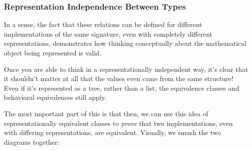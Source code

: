 \documentclass[aspectratio=169, handout]{beamer}
\begin{document}
\begin{frame}[fragile]
  \frametitle{Representation Independence Between Types}

  In a sense, the fact that these relations can be defined for different
  implementations of the same signature, even with completely different
  representations, demonstrates how thinking conceptually about the
  mathematical object being represented is valid.

  \pause
  \vspace{\fill}

  Once you are able to think in a representationally independent way,
  it's clear that it shouldn't matter at all that the values even came from
  the same structure! Even if it's represented as a tree, rather than a
  list, the equivalence classes and behavioral equivalences still apply.

  \pause
  \vspace{\fill}

  The most important part of this is that then, we can use this idea of
  representationally equivalent classes to \textit{prove} that two
  implementations, even with differing representations, are equivalent.
  Visually, we smush the two diagrams together:
\end{frame}
\end{document}
